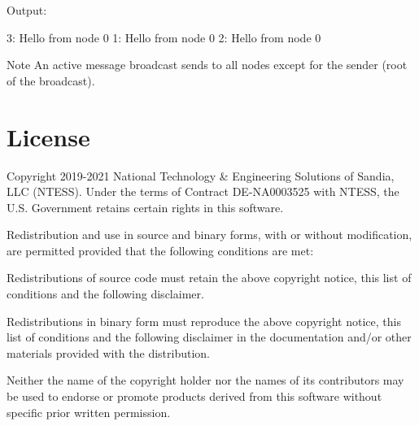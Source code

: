 

Output\+: 
\begin{DoxyCode}
3: Hello from node 0
1: Hello from node 0
2: Hello from node 0
\end{DoxyCode}


\begin{DoxyNote}{Note}
An active message broadcast sends to all nodes except for the sender (root of the broadcast). 
\end{DoxyNote}
\hypertarget{introduction_License}{}\section{License}\label{introduction_License}


Copyright 2019-\/2021 National Technology \& Engineering Solutions of Sandia, L\+LC (N\+T\+E\+SS). Under the terms of Contract D\+E-\/\+N\+A0003525 with N\+T\+E\+SS, the U.\+S. Government retains certain rights in this software.

Redistribution and use in source and binary forms, with or without modification, are permitted provided that the following conditions are met\+:


\begin{DoxyItemize}
\item Redistributions of source code must retain the above copyright notice, this list of conditions and the following disclaimer.
\item Redistributions in binary form must reproduce the above copyright notice, this list of conditions and the following disclaimer in the documentation and/or other materials provided with the distribution.
\item Neither the name of the copyright holder nor the names of its contributors may be used to endorse or promote products derived from this software without specific prior written permission.
\end{DoxyItemize}

